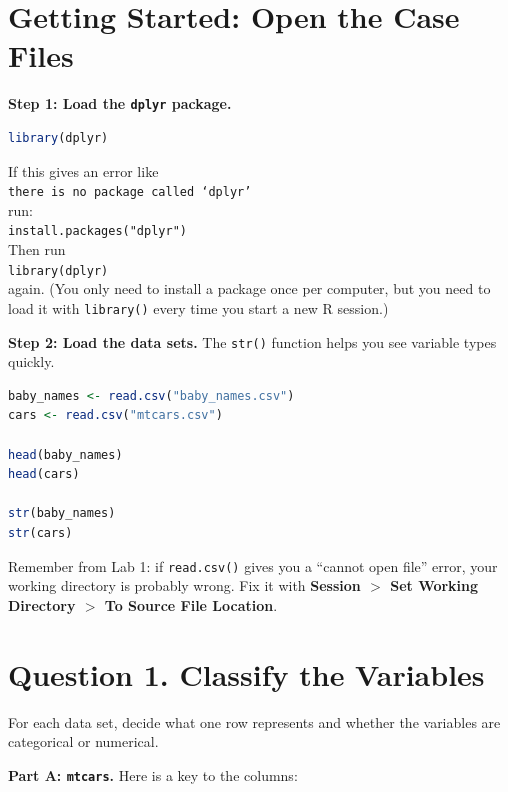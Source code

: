 \documentclass[11pt]{article}
\begin{document}
\section*{Getting Started: Open the Case Files}

\textbf{Step 1: Load the \texttt{dplyr} package.}

\begin{lstlisting}[language=R]
library(dplyr)
\end{lstlisting}

If this gives an error like\\
 \texttt{there is no package called `dplyr'}\\
 run: \\
 \texttt{install.packages("dplyr")}\\
 Then run \\
 \texttt{library(dplyr)} \\
 again. (You only need to install a package once per computer, but you need to load it with \texttt{library()} every time you start a new R session.)

\textbf{Step 2: Load the data sets.} The \texttt{str()} function helps you see variable types quickly.

\begin{lstlisting}[language=R]
baby_names <- read.csv("baby_names.csv")
cars <- read.csv("mtcars.csv")

head(baby_names)
head(cars)

str(baby_names)
str(cars)
\end{lstlisting}

Remember from Lab 1: if \texttt{read.csv()} gives you a ``cannot open file'' error, your working directory is probably wrong. Fix it with \textbf{Session $>$ Set Working Directory $>$ To Source File Location}.

\section*{Question 1. Classify the Variables}

For each data set, decide what one row represents and whether the variables are categorical or numerical.

\textbf{Part A: \texttt{mtcars}.} Here is a key to the columns:
\end{document}
